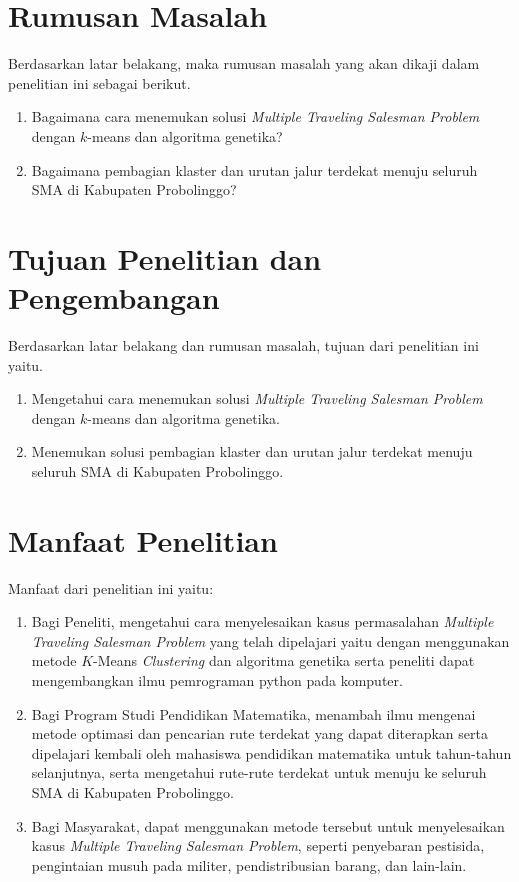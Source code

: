 \section{Rumusan Masalah}

Berdasarkan latar belakang, maka rumusan masalah yang akan dikaji dalam penelitian ini sebagai berikut.
\begin{enumerate}
    \item Bagaimana cara menemukan solusi \textit{Multiple Traveling Salesman Problem} dengan $k$-means dan algoritma genetika?
    \item Bagaimana pembagian klaster dan urutan jalur terdekat menuju seluruh SMA di Kabupaten Probolinggo?
\end{enumerate}

\section{Tujuan Penelitian dan Pengembangan}

Berdasarkan latar belakang dan rumusan masalah, tujuan dari penelitian ini yaitu.
\begin{enumerate}
	\item Mengetahui cara menemukan solusi \textit{Multiple Traveling Salesman Problem} dengan $k$-means dan algoritma genetika.
	\item Menemukan solusi pembagian klaster dan urutan jalur terdekat menuju seluruh SMA di Kabupaten Probolinggo.
\end{enumerate}

\section{Manfaat Penelitian}

Manfaat dari penelitian ini yaitu:
\begin{enumerate}
	\item Bagi Peneliti, mengetahui cara menyelesaikan kasus permasalahan \textit{Multiple Traveling Salesman Problem} yang telah dipelajari yaitu dengan menggunakan metode $K$-Means \textit{Clustering} dan algoritma genetika serta peneliti dapat mengembangkan ilmu pemrograman python pada komputer.

	\item Bagi Program Studi Pendidikan Matematika, menambah ilmu mengenai metode optimasi dan pencarian rute terdekat yang dapat diterapkan serta dipelajari kembali oleh mahasiswa pendidikan matematika untuk tahun-tahun selanjutnya, serta mengetahui rute-rute terdekat untuk menuju ke seluruh SMA di Kabupaten Probolinggo.
	
	\item Bagi Masyarakat, dapat menggunakan metode tersebut untuk menyelesaikan kasus \textit{Multiple Traveling Salesman Problem}, seperti penyebaran pestisida, pengintaian musuh pada militer, pendistribusian barang, dan lain-lain.
	
\end{enumerate}

